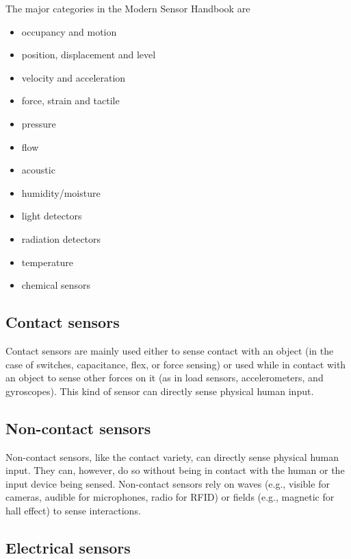 The major categories in the Modern Sensor Handbook are
\begin{itemize}
    \item occupancy and motion
    \item position, displacement and level
    \item velocity and acceleration
    \item force, strain and tactile
    \item pressure
    \item flow
    \item acoustic
    \item humidity/moisture
    \item light detectors
    \item radiation detectors
    \item temperature
    \item chemical sensors
\end{itemize}



\subsection{Contact sensors}

Contact sensors are mainly used either to sense contact with an object (in the case of switches, capacitance, flex, or force sensing) or used while in contact with an object to sense other forces on it (as in load sensors, accelerometers, and gyroscopes). This kind of sensor can directly sense physical human input.

\subsection{Non-contact sensors}

Non-contact sensors, like the contact variety, can directly sense physical human input. They can, however, do so without being in contact with the human or the input device being sensed. Non-contact sensors rely on waves (e.g., visible for cameras, audible for microphones, radio for RFID) or fields (e.g., magnetic for hall effect) to sense interactions. 

\subsection{Electrical sensors}

